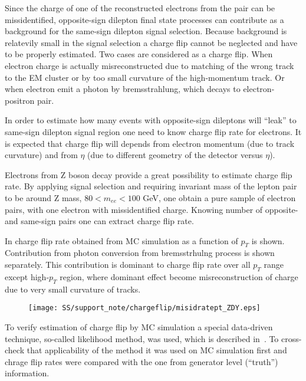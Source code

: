 Since the charge of one of the reconstructed electrons from the pair can be missidentified, 
opposite-sign dilepton final state processes can contribute as a background for the same-sign dilepton signal selection.
Because background is relatevily small in the signal selection a charge flip cannot be neglected and have to be properly estimated. Two cases are considered as a charge flip. When electron charge is actually misreconstructed due to matching of the wrong track to the EM cluster or by too small curvature of the high-momentum track. Or when electron emit a photon by bremsstrahlung, which decays to electron-positron pair. 

In order to estimate how many events with opposite-sign dileptons will ``leak'' to same-sign dilepton signal region one
need to know charge flip rate for electrons. It is expected that charge flip will depends from electron momentum (due to track curvature) and from $\eta$ (due to different geometry of the detector versus $\eta$).

Electrons from Z boson decay provide a great possibility to estimate charge flip rate. By applying signal selection
and requiring invariant mass of the lepton pair to be around Z mass, $80 < m_{ee} < 100$ GeV, one obtain a pure
sample of electron pairs, with one electron with missidentified charge. Knowing number of opposite- and same-sign
pairs one can extract charge flip rate.

In  charge flip rate obtained from MC simulation as a function of $p_T$ is shown.
Contribution from photon conversion from bremsstrhulng process is shown separately. This contribution is dominant 
to charge flip rate over all $p_T$ range except high-$p_T$ region, where dominant effect become misreconstruction 
of charge due to very small curvature of tracks.


\begin{figure}
\begin{center}
 \texttt{[image: SS/support\_note/chargeflip/misidratept\_ZDY.eps]}
\caption{\toDo[caption]}
\label{fig:chargeFlip_structure}
\end{center}
\end{figure}

To verify estimation of charge flip by MC simulation a special data-driven technique, so-called likelihood method, was used, which is described in~\cite{same_sign_paper_7tev}. To cross-check that applicability of the method it was used on 
MC simulation first and chrage flip rates were compared with the one from generator level (``truth'') information. 

